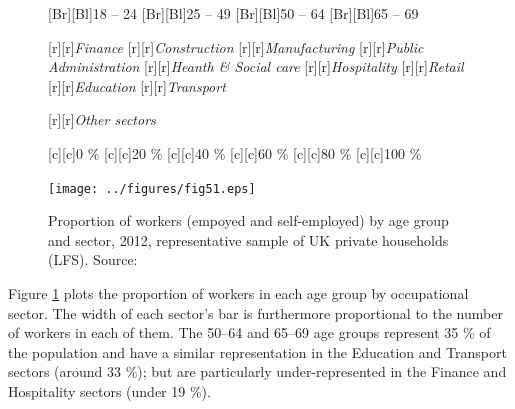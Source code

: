 \documentclass[11 pt, a4paper]{report}
\begin{document}
\begin{figure}[hbtp!]
[Br][Bl]{\small{18 -- 24}}
[Br][Bl]{\small{25 -- 49}}
[Br][Bl]{\small{50 -- 64}}
[Br][Bl]{\small{65 -- 69}}


[r][r]{\small{\emph{Finance}}}
[r][r]{\small{\emph{Construction}}}
[r][r]{\small{\emph{Manufacturing}}}
[r][r]{\small{\emph{Public Administration}}}
[r][r]{\small{\emph{Heanth \& Social care}}}
[r][r]{\small{\emph{Hospitality}}}
[r][r]{\small{\emph{Retail}}}
[r][r]{\small{\emph{Education}}}
[r][r]{\small{\emph{Transport}}}

[r][r]{\small{\emph{Other sectors}}}

[c][c]{\small{0 \%}}
[c][c]{\small{20 \%}}
[c][c]{\small{40 \%}}
[c][c]{\small{60 \%}}
[c][c]{\small{80 \%}}
[c][c]{\small{100 \%}}


\texttt{[image: ../figures/fig51.eps]}
\caption{Proportion of workers (empoyed and self-employed) by age group and sector, 2012, representative sample of UK private households (LFS). Source: \cite{DWP2013}}\label{Fig:51}
\end{figure}


Figure \ref{Fig:51} plots the proportion of workers in each age group by occupational sector. The width of each sector's bar is  furthermore proportional to the number of workers in each of them. The 50--64 and 65--69 age groups represent 35 \% of the population and have a similar representation in the Education and Transport sectors (around 33 \%); but are particularly under-represented in the Finance and Hospitality sectors (under 19 \%).
\end{document}
